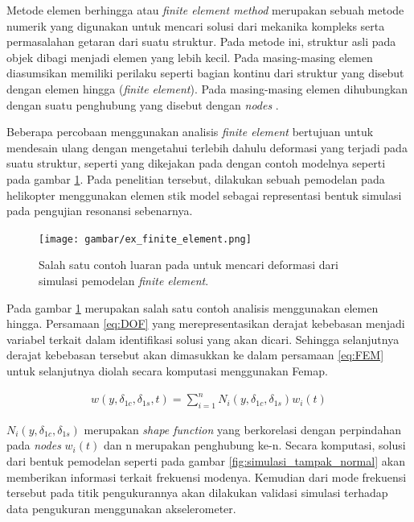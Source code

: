 Metode elemen berhingga atau \textit{finite element method} merupakan sebuah metode numerik yang digunakan untuk mencari solusi dari mekanika kompleks serta permasalahan getaran dari suatu struktur. Pada metode ini, struktur asli pada objek dibagi menjadi elemen yang lebih kecil. Pada masing-masing elemen diasumsikan memiliki perilaku seperti bagian kontinu dari struktur yang disebut dengan elemen hingga (\textit{finite element}). Pada masing-masing elemen dihubungkan dengan suatu penghubung yang disebut dengan \textit{nodes} \cite{Lojewski2020InfluenceOC}.

Beberapa percobaan menggunakan analisis \textit{finite element} bertujuan untuk mendesain ulang dengan mengetahui terlebih dahulu deformasi yang terjadi pada suatu struktur, seperti yang dikejakan pada \cite{Gorecki2013} dengan contoh modelnya seperti pada gambar \ref{fig:ex_finite_element}. Pada penelitian tersebut, dilakukan sebuah pemodelan pada helikopter menggunakan elemen stik model sebagai representasi bentuk simulasi pada pengujian resonansi sebenarnya.

\begin{figure}[H]
	\centering
	\texttt{[image: gambar/ex\_finite\_element.png]}
	\caption{Salah satu contoh luaran pada \cite{Gorecki2013} untuk mencari deformasi dari simulasi pemodelan \textit{finite element}.}
	\label{fig:ex_finite_element}
\end{figure}

Pada gambar \ref{fig:ex_finite_element} merupakan salah satu contoh analisis menggunakan elemen hingga. Persamaan \ref{eq:DOF} yang merepresentasikan derajat kebebasan menjadi variabel terkait dalam identifikasi solusi yang akan dicari. Sehingga selanjutnya derajat kebebasan tersebut akan dimasukkan ke dalam persamaan \ref{eq:FEM} untuk selanjutnya diolah secara komputasi menggunakan Femap.

\begin{align}
	\label{eq:FEM}
	w(y,\delta_{1c}, \delta_{1s}, t)=\sum_{i=1}^{n}N_i(y,\delta_{1c}, \delta_{1s})w_i(t)
\end{align}

$N_i(y,\delta_{1c}, \delta_{1s})$ merupakan \textit{shape function} yang berkorelasi dengan perpindahan pada \textit{nodes} $w_i(t)$ dan n merupakan penghubung ke-n. Secara komputasi, solusi dari bentuk pemodelan seperti pada gambar \ref{fig:simulasi_tampak_normal} akan memberikan informasi terkait frekuensi modenya. Kemudian dari mode frekuensi tersebut pada titik pengukurannya akan dilakukan validasi simulasi terhadap data pengukuran menggunakan akselerometer.


